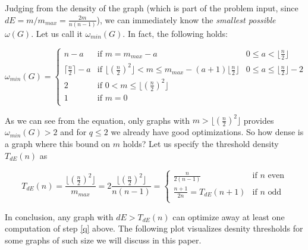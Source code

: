 \documentclass[a4paper]{article}
\begin{document}
Judging from the density of the graph (which is part of the problem input, since $dE = m/m_{max} = \frac{2m}{n(n-1)}$), we can immediately know the \emph{smallest possible} $\omega(G)$. Let us call it $\omega_{min}(G)$. In fact, the following holds:

\begin{equation}\label{omega}
\omega_{min}(G) = \left\{ \begin{array}{lll}
                           n - a & \text{if } m = m_{max} - a & 0 \leq a < \lfloor\frac{n}{2}\rfloor \\
                           \lceil\frac{n}{2}\rceil - a & \text{if } \lfloor(\frac{n}{2})^2\rfloor < m \leq m_{max} - (a + 1)\lfloor\frac{n}{2}\rfloor & 0 \leq a \leq \lfloor\frac{n}{2}\rfloor - 2 \\
                           2 & \text{if } 0 < m \leq \lfloor(\frac{n}{2})^2\rfloor & \\
                           1 & \text{if } m = 0 & \\
                          \end{array}
                  \right.
\end{equation}

As we can see from the equation, only graphs with $m > \lfloor(\frac{n}{2})^2\rfloor$ provides $\omega_{min}(G) > 2$ and for $q \leq 2$ we already have good optimizations. So how dense is a graph where this bound on $m$ holds? Let us specify the threshold density $T_{dE}(n)$ as

$$
T_{dE}(n) = \frac{\lfloor(\frac{n}{2})^2\rfloor}{m_{max}} = 2\frac{\lfloor(\frac{n}{2})^2\rfloor}{n(n-1)} = \left\{ \begin{array}{ll}
          \frac{n}{2(n-1)} & \text{if } n \text{ even}\\
          \frac{n + 1}{2n} = T_{dE}(n+1) & \text{if } n \text{ odd}\\
          \end{array}
  \right.
$$

In conclusion, any graph with $dE > T_{dE}(n)$ can optimize away at least one computation of step \ref{q} above. The following plot visualizes desnity thresholds for some graphs of such size we will discuss in this paper.

\begin{center}
\end{center}
\end{document}
